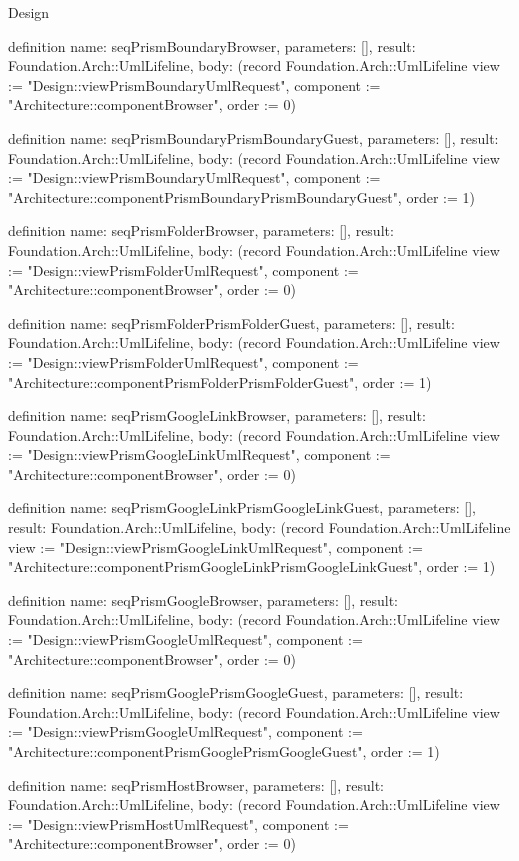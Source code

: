 \begin{lexlean}{Design}
\begin{semanticmodule}
definition{
  name: seqPrismBoundaryBrowser,
  parameters: [],
  result: Foundation.Arch::UmlLifeline,
  body: (record Foundation.Arch::UmlLifeline {view := "Design::viewPrismBoundaryUmlRequest", component := "Architecture::componentBrowser", order := 0})
}

definition{
  name: seqPrismBoundaryPrismBoundaryGuest,
  parameters: [],
  result: Foundation.Arch::UmlLifeline,
  body: (record Foundation.Arch::UmlLifeline {view := "Design::viewPrismBoundaryUmlRequest", component := "Architecture::componentPrismBoundaryPrismBoundaryGuest", order := 1})
}

definition{
  name: seqPrismFolderBrowser,
  parameters: [],
  result: Foundation.Arch::UmlLifeline,
  body: (record Foundation.Arch::UmlLifeline {view := "Design::viewPrismFolderUmlRequest", component := "Architecture::componentBrowser", order := 0})
}

definition{
  name: seqPrismFolderPrismFolderGuest,
  parameters: [],
  result: Foundation.Arch::UmlLifeline,
  body: (record Foundation.Arch::UmlLifeline {view := "Design::viewPrismFolderUmlRequest", component := "Architecture::componentPrismFolderPrismFolderGuest", order := 1})
}

definition{
  name: seqPrismGoogleLinkBrowser,
  parameters: [],
  result: Foundation.Arch::UmlLifeline,
  body: (record Foundation.Arch::UmlLifeline {view := "Design::viewPrismGoogleLinkUmlRequest", component := "Architecture::componentBrowser", order := 0})
}

definition{
  name: seqPrismGoogleLinkPrismGoogleLinkGuest,
  parameters: [],
  result: Foundation.Arch::UmlLifeline,
  body: (record Foundation.Arch::UmlLifeline {view := "Design::viewPrismGoogleLinkUmlRequest", component := "Architecture::componentPrismGoogleLinkPrismGoogleLinkGuest", order := 1})
}

definition{
  name: seqPrismGoogleBrowser,
  parameters: [],
  result: Foundation.Arch::UmlLifeline,
  body: (record Foundation.Arch::UmlLifeline {view := "Design::viewPrismGoogleUmlRequest", component := "Architecture::componentBrowser", order := 0})
}

definition{
  name: seqPrismGooglePrismGoogleGuest,
  parameters: [],
  result: Foundation.Arch::UmlLifeline,
  body: (record Foundation.Arch::UmlLifeline {view := "Design::viewPrismGoogleUmlRequest", component := "Architecture::componentPrismGooglePrismGoogleGuest", order := 1})
}

definition{
  name: seqPrismHostBrowser,
  parameters: [],
  result: Foundation.Arch::UmlLifeline,
  body: (record Foundation.Arch::UmlLifeline {view := "Design::viewPrismHostUmlRequest", component := "Architecture::componentBrowser", order := 0})
}


\end{semanticmodule}
\end{lexlean}

